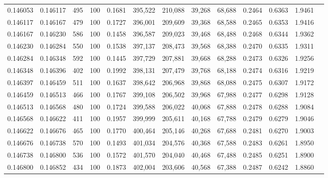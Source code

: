 \begin{tabular}{rrrrrrrrrrrrr}
0.146053 & 0.146117 &   495 & 100 &                                     0.1681 & 395,522 & 210,088 &  39,268 &  68,688 & 0.2464 & 0.6363 & 1.9461 \\
0.146117 & 0.146167 &   479 & 100 &                                     0.1727 & 396,001 & 209,609 &  39,368 &  68,588 & 0.2465 & 0.6353 & 1.9416 \\
0.146167 & 0.146230 &   586 & 100 &                                     0.1458 & 396,587 & 209,023 &  39,468 &  68,488 & 0.2468 & 0.6344 & 1.9362 \\
0.146230 & 0.146284 &   550 & 100 &                                     0.1538 & 397,137 & 208,473 &  39,568 &  68,388 & 0.2470 & 0.6335 & 1.9311 \\
0.146284 & 0.146348 &   592 & 100 &                                     0.1445 & 397,729 & 207,881 &  39,668 &  68,288 & 0.2473 & 0.6326 & 1.9256 \\
0.146348 & 0.146396 &   402 & 100 &                                     0.1992 & 398,131 & 207,479 &  39,768 &  68,188 & 0.2474 & 0.6316 & 1.9219 \\
0.146397 & 0.146459 &   511 & 100 &                                     0.1637 & 398,642 & 206,968 &  39,868 &  68,088 & 0.2475 & 0.6307 & 1.9172 \\
0.146459 & 0.146513 &   466 & 100 &                                     0.1767 & 399,108 & 206,502 &  39,968 &  67,988 & 0.2477 & 0.6298 & 1.9128 \\
0.146513 & 0.146568 &   480 & 100 &                                     0.1724 & 399,588 & 206,022 &  40,068 &  67,888 & 0.2478 & 0.6288 & 1.9084 \\
0.146568 & 0.146622 &   411 & 100 &                                     0.1957 & 399,999 & 205,611 &  40,168 &  67,788 & 0.2479 & 0.6279 & 1.9046 \\
0.146622 & 0.146676 &   465 & 100 &                                     0.1770 & 400,464 & 205,146 &  40,268 &  67,688 & 0.2481 & 0.6270 & 1.9003 \\
0.146676 & 0.146738 &   570 & 100 &                                     0.1493 & 401,034 & 204,576 &  40,368 &  67,588 & 0.2483 & 0.6261 & 1.8950 \\
0.146738 & 0.146800 &   536 & 100 &                                     0.1572 & 401,570 & 204,040 &  40,468 &  67,488 & 0.2485 & 0.6251 & 1.8900 \\
0.146800 & 0.146852 &   434 & 100 &                                     0.1873 & 402,004 & 203,606 &  40,568 &  67,388 & 0.2487 & 0.6242 & 1.8860 \\

\end{tabular}
